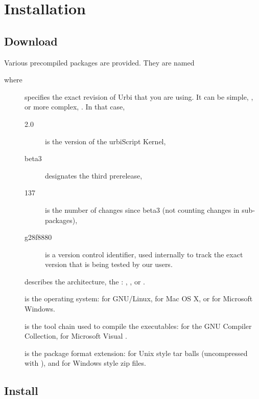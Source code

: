 \chapter{Installation}
\label{sec:installation}

\section{Download}

Various precompiled packages are provided.  They are named
\begin{center}
\end{center}
where
\begin{description}
\item[] specifies the exact revision of Urbi that you are
  using.  It can be simple, , or more complex,
  .  In that case,
  \begin{description}
  \item[2.0] is the version of the urbiScript Kernel,
  \item[beta3] designates the third prerelease,
  \item[137] is the number of changes since beta3 (not counting
    changes in sub-packages),
  \item[g28f8880] is a version control identifier, used internally to
    track the exact version that is being tested by our users.
  \end{description}
\item[] describes the architecture, the :
  , , or .
\item[] is the operating system:  for GNU/Linux,
   for Mac OS X, or  for Microsoft Windows.
\item[] is the tool chain used to compile the
  executables:  for the GNU Compiler Collection, 
  for Microsoft Visual \Cxx.
\item[] is the package format extension:  for
  Unix style tar balls (uncompressed with ), and  for Windows style zip files.
\end{description}

\section{Install}

